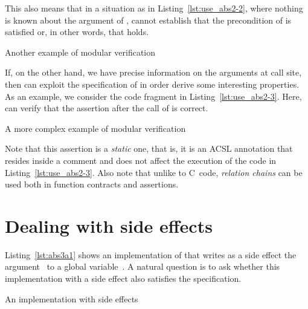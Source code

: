 This also means that in a situation as in Listing~\ref{lst:use_abs2-2},
where nothing is known about the argument of , 
\framacwp cannot establish that the precondition of  is satisfied
or, in other words, that  holds.

\begin{listing}[hbt]
\begin{minipage}{\textwidth}

\end{minipage}
\caption{\label{lst:use_abs2-2} Another example of modular verification}
\end{listing}

\FloatBarrier

If, on the other hand, we have precise information on the arguments at call site, then \framacwp can exploit the specification of 
 in order derive some interesting properties.
As an example, we consider the code fragment in Listing~\ref{lst:use_abs2-3}.
Here, \framacwp can verify that the assertion after 
the call of  is correct.


\begin{listing}[hbt]
\begin{minipage}{\textwidth}

\end{minipage}
\caption{\label{lst:use_abs2-3} A more complex example of modular verification}
\end{listing}

Note that this assertion is a \emph{static} one, that is, it is
an ACSL annotation that resides inside a comment and does not affect
the execution of the code in Listing~\ref{lst:use_abs2-3}.
Also note that unlike to C~code, \emph{relation chains} can be used both in function
contracts and assertions.


\section{Dealing with side effects}
\label{sec:side-effects}

Listing~\ref{lst:abs3a1} shows an implementation of 
that writes as a side effect the argument~ to a global variable~.
A natural question is to ask whether this implementation with a side effect
also satisfies the specification.

\begin{listing}[hbt]
\begin{minipage}{\textwidth}

\end{minipage}
\caption{\label{lst:abs3a1} An implementation with side effects}
\end{listing}

